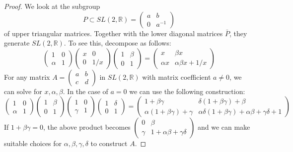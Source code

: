 \documentclass[
  12pt
]{article}
\theoremstyle{plain}
\newtheorem*{proof}{Proof}
\begin{document}
  \begin{proof}
    \label{ref:lem:pf:decomp}
    We look at the subgroup
    \[P \subset SL(2, \mathbb{R}) = \begin{pmatrix}a & b \\ 0 & a^{-1}\end{pmatrix}\]
    of upper triangular matrices. Together with the lower diagonal matrices
    $\bar{P}$, they generate $SL(2, \mathbb{R})$. To see this, decompose
    as follows: \[\begin{pmatrix}1&0\\\alpha&1\end{pmatrix}
    \begin{pmatrix}x&0\\0&1/x\end{pmatrix}
    \begin{pmatrix}1&\beta\\0&1\end{pmatrix} = 
    \begin{pmatrix} x&\beta x\\\alpha x& \alpha\beta x+1/x\end{pmatrix}\]
    For any matrix $A = \begin{pmatrix}a & b \\ c & d\end{pmatrix}$ in
    $SL(2, \mathbb{R})$ with matrix coefficient $a \neq 0$, we can solve
    for $x,\alpha, \beta$. In the case of $a = 0$ we can use the
    following construction:
    \[
      \begin{pmatrix} 1&0\\\alpha&1\end{pmatrix}
      \begin{pmatrix} 1&\beta\\0&1\end{pmatrix}
      \begin{pmatrix} 1&0\\\gamma&1\end{pmatrix}
      \begin{pmatrix} 1&\delta\\0&1\end{pmatrix}=
      \begin{pmatrix}
        1+\beta\gamma&\delta(1+\beta\gamma)+\beta\\
        \alpha(1+\beta\gamma)+\gamma&\alpha\delta(1+\beta\gamma)+\alpha\beta+\gamma\delta+1
      \end{pmatrix}
    \]
    If $1 + \beta\gamma = 0$, the above product becomes
    $\begin{pmatrix} 0&\beta\\ \gamma& 1+\alpha\beta+\gamma\delta \end{pmatrix}$
    and we can make suitable choices for $\alpha, \beta, \gamma, \delta$
    to construct $A$.


\end{proof}
\end{document}
